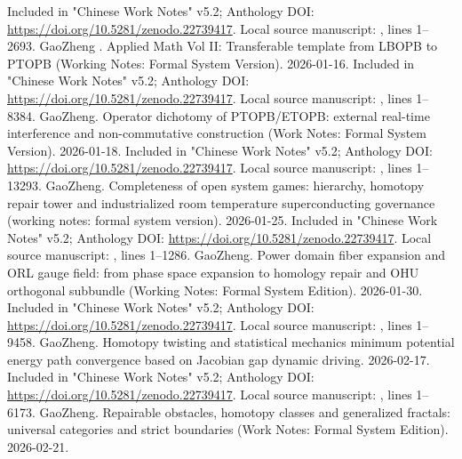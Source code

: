 \documentclass[11pt,a4paper]{article}
\theoremstyle{plain}
\theoremstyle{definition}
\theoremstyle{remark}
\begin{document}
\begin{CJK*}
\begin{thebibliography}
Included in "Chinese Work Notes" v5.2; Anthology DOI: \url{https://doi.org/10.5281/zenodo.22739417}.\newblock
Local source manuscript: , lines 1--2693.  GaoZheng . Applied Math Vol II: Transferable template from LBOPB to PTOPB (Working Notes: Formal System Version). 2026-01-16.\newblock
Included in "Chinese Work Notes" v5.2; Anthology DOI: \url{https://doi.org/10.5281/zenodo.22739417}.\newblock
Local source manuscript: , lines 1--8384.  GaoZheng. Operator dichotomy of PTOPB/ETOPB: external real-time interference and non-commutative construction (Work Notes: Formal System Version). 2026-01-18.\newblock
Included in "Chinese Work Notes" v5.2; Anthology DOI: \url{https://doi.org/10.5281/zenodo.22739417}.\newblock
Local source manuscript: , lines 1--13293.  GaoZheng. Completeness of open system games: hierarchy, homotopy repair tower and industrialized room temperature superconducting governance (working notes: formal system version). 2026-01-25.\newblock
Included in "Chinese Work Notes" v5.2; Anthology DOI: \url{https://doi.org/10.5281/zenodo.22739417}.\newblock
Local source manuscript: , lines 1--1286.  GaoZheng. Power domain fiber expansion and ORL gauge field: from phase space expansion to homology repair and OHU orthogonal subbundle (Working Notes: Formal System Edition). 2026-01-30.\newblock
Included in "Chinese Work Notes" v5.2; Anthology DOI: \url{https://doi.org/10.5281/zenodo.22739417}.\newblock
Local source manuscript: , lines 1--9458.  GaoZheng. Homotopy twisting and statistical mechanics minimum potential energy path convergence based on Jacobian gap dynamic driving. 2026-02-17.\newblock
Included in "Chinese Work Notes" v5.2; Anthology DOI: \url{https://doi.org/10.5281/zenodo.22739417}.\newblock
Local source manuscript: , lines 1--6173.  GaoZheng. Repairable obstacles, homotopy classes and generalized fractals: universal categories and strict boundaries (Work Notes: Formal System Edition). 2026-02-21.\newblock

\end{thebibliography}
\end{CJK*}
\end{document}
